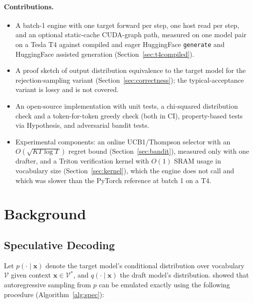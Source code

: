 \documentclass[11pt]{article}
\begin{document}
\paragraph{Contributions.}
\begin{itemize}
  \item A batch-1 engine with one target forward per step, one host read
        per step, and an optional static-cache CUDA-graph path, measured on
        one model pair on a Tesla T4 against compiled and eager HuggingFace
        \texttt{generate} and HuggingFace assisted generation
        (Section~\ref{sec:t4compiled}).
  \item A proof sketch of output distribution equivalence to the target
        model for the rejection-sampling variant
        (Section~\ref{sec:correctness}); the typical-acceptance variant is
        lossy and is not covered.
  \item An open-source implementation with unit tests, a chi-squared
        distribution check and a token-for-token greedy check (both in
        CI), property-based tests via Hypothesis, and adversarial bandit
        tests.
  \item Experimental components: an online UCB1/Thompson selector with an
        $O(\sqrt{KT\log T})$ regret bound (Section~\ref{sec:bandit}),
        measured only with one drafter, and a Triton verification kernel
        with $O(1)$ SRAM usage in vocabulary size
        (Section~\ref{sec:kernel}), which the engine does not call and
        which was slower than the PyTorch reference at batch 1 on a T4.
\end{itemize}

\section{Background}
\label{sec:background}

\subsection{Speculative Decoding}

Let $p(\cdot \mid \mathbf{x})$ denote the target model's conditional
distribution over vocabulary $\mathcal{V}$ given context
$\mathbf{x} \in \mathcal{V}^*$, and $q(\cdot \mid \mathbf{x})$ the draft
model's distribution.
\citet{leviathan2023fast} showed that autoregressive sampling from $p$ can
be emulated exactly using the following procedure (Algorithm~\ref{alg:spec}):
\end{document}
